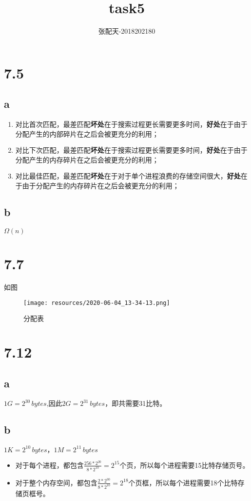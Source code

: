 \documentclass[UTF8]{ctexart}
\title{task5}
\author{张配天-2018202180}
\begin{document}
    \maketitle
    \section{7.5}
    \subsection{a}
    \begin{enumerate}[1.]
        \item 对比首次匹配，最差匹配\textbf{坏处}在于搜索过程更长需要更多时间，\textbf{好处}在于由于分配产生的内部碎片在之后会被更充分的利用；
        \item 对比下次匹配，最差匹配\textbf{坏处}在于搜索过程更长需要更多时间，\textbf{好处}在于由于分配产生的内存碎片在之后会被更充分的利用；
        \item 对比最佳匹配，最差匹配\textbf{坏处}在于对于单个进程浪费的存储空间很大，\textbf{好处}在于由于分配产生的内存碎片在之后会被更充分的利用；
    \end{enumerate}
    \subsection{b}
    $\Omega(n)$
    
    \section{7.7}
    如图
    \begin{figure}[htb]
        \centering
        \texttt{[image: resources/2020-06-04\_13-34-13.png]}
        \caption{分配表}
        \label{}
    \end{figure}
    \section{7.12}
    \subsection{a}
    $1G=2^{30}\, bytes$,因此$2G=2^{31}\, bytes$，即共需要31比特。
    \subsection{b}
    $1K=2^{10}\, bytes，1M=2^{11}\, bytes$
    \begin{itemize}
        \item 对于每个进程，都包含$\frac{256*2^{20}}{8*2^{10}} = 2^{15}$个页，所以每个进程需要15比特存储页号。
        \item 对于整个内存空间，都包含$\frac{2*2^{30}}{8*2^{10}} = 2^{18}$个页框，所以每个进程需要18个比特存储页框号。
    \end{itemize}
\end{document}
